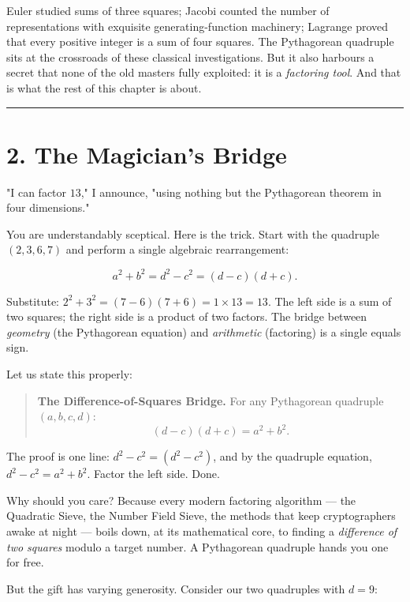 \documentclass[11pt,openany]{book}
\theoremstyle{definition}
\theoremstyle{plain}
\theoremstyle{remark}
\begin{document}
Euler studied sums of three squares; Jacobi counted the number of representations with exquisite generating-function machinery; Lagrange proved that every positive integer is a sum of four squares. The Pythagorean quadruple sits at the crossroads of these classical investigations. But it also harbours a secret that none of the old masters fully exploited: it is a \textit{factoring tool}. And that is what the rest of this chapter is about.

\bigskip\noindent\rule{\textwidth}{0.4pt}\bigskip


\section{2. The Magician's Bridge}


"I can factor $13$," I announce, "using nothing but the Pythagorean theorem in four dimensions."

You are understandably sceptical. Here is the trick. Start with the quadruple $(2, 3, 6, 7)$ and perform a single algebraic rearrangement:

$$a^2 + b^2 = d^2 - c^2 = (d - c)(d + c).$$

Substitute: $2^2 + 3^2 = (7 - 6)(7 + 6) = 1 \times 13 = 13$. The left side is a sum of two squares; the right side is a product of two factors. The bridge between \textit{geometry} (the Pythagorean equation) and \textit{arithmetic} (factoring) is a single equals sign.

Let us state this properly:

\begin{quote}
\textbf{The Difference-of-Squares Bridge.} For any Pythagorean quadruple $(a, b, c, d)$:
$$(d - c)(d + c) = a^2 + b^2.$$
\end{quote}


The proof is one line: $d^2 - c^2 = (d^2 - c^2)$, and by the quadruple equation, $d^2 - c^2 = a^2 + b^2$. Factor the left side. Done.

Why should you care? Because every modern factoring algorithm — the Quadratic Sieve, the Number Field Sieve, the methods that keep cryptographers awake at night — boils down, at its mathematical core, to finding a \textit{difference of two squares} modulo a target number. A Pythagorean quadruple hands you one for free.

But the gift has varying generosity. Consider our two quadruples with $d = 9$:
\end{document}

